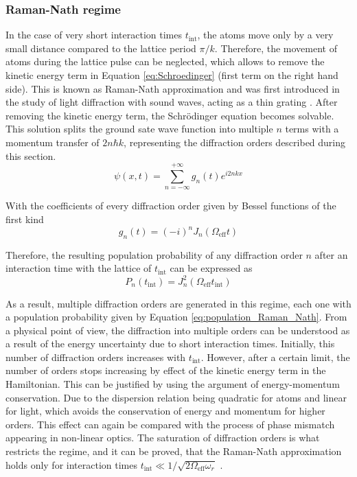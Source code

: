 \subsubsection{Raman-Nath regime}
In the case of very short interaction times $t_\text{int}$, the atoms move only by a very small distance compared to the lattice period $\pi/k$. Therefore, the movement of atoms during the lattice pulse can be neglected, which allows to remove the kinetic energy term in Equation \eqref{eq:Schroedinger} (first term on the right hand side). This is known as Raman-Nath approximation and was first introduced in the study of light diffraction with sound waves, acting as a thin grating \cite{Raman1935}. After removing the kinetic energy term, the Schr\"odinger equation becomes solvable. This solution splits the ground sate wave function into multiple $n$ terms with a momentum transfer of $2n\hbar k$, representing the diffraction orders described during this section.
\begin{equation}
	\psi(x,t) = \sum_{n=-\infty}^{+\infty}g_n(t)e^{i 2nkx}
\end{equation}

With the coefficients of every diffraction order given by Bessel functions of the first kind \cite{Mueller2008}
\begin{equation}
	g_n(t) = (-i)^n J_n(\Omega_\text{eff} t)
\end{equation}

Therefore, the resulting population probability of any diffraction order $n$ after an interaction time with the lattice of $t_\text{int}$ can be expressed as
\begin{equation}\label{eq:population_Raman_Nath}
	P_n(t_\text{int}) = J_n^2(\Omega_\text{eff} t_\text{int})
\end{equation}

As a result, multiple diffraction orders are generated in this regime, each one with a population probability given by Equation \eqref{eq:population_Raman_Nath}. From a physical point of view, the diffraction into multiple orders can be understood as a result of the energy uncertainty due to short interaction times. Initially, this number of diffraction orders increases with $t_\text{int}$. However, after a certain limit, the number of orders stops increasing by effect of the kinetic energy term in the Hamiltonian. This can be justified by using the argument of energy-momentum conservation. Due to the dispersion relation being quadratic for atoms and linear for light, which avoids the conservation of energy and momentum for higher orders. This effect can again be compared with the process of phase mismatch appearing in non-linear optics. The saturation of diffraction orders is what restricts the regime, and it can be proved, that the Raman-Nath approximation holds only for interaction times $t_\text{int} \ll 1/\sqrt{2\Omega_\text{eff} \omega_r}$ \cite{Meystre2001}. 

